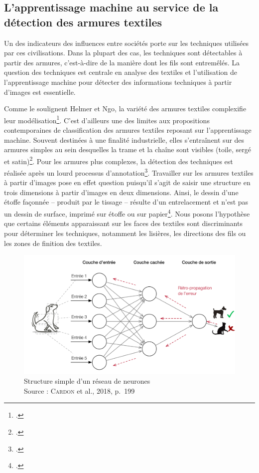 \subsection{L'apprentissage machine au service de la détection des armures textiles}

Un des indicateurs des influences entre sociétés porte sur les techniques utilisées par ces civilisations. Dans la plupart des cas, les techniques sont détectables à partir des armures, c'est-à-dire de la manière dont les fils sont entremêlés. La question des techniques est centrale en analyse des textiles et l'utilisation de l'apprentissage machine pour détecter des informations techniques à partir d'images est essentielle.


Comme le soulignent  Helmer et Ngo, la variété des armures textiles complexifie leur modélisation\footcite[p.~160]{helmerSimilarityMeasureWeaving2018}. C'est d'ailleurs une des limites aux propositions contemporaines de classification des armures textiles reposant sur l'apprentissage machine. Souvent destinées à une finalité industrielle, elles s'entraînent sur des armures simples au sein desquelles la trame et la chaîne sont visibles (toile, sergé et satin)\footcite[p.~6365-6369]{mengAutomaticRecognitionWoven2022}. Pour les armures plus complexes, la détection des techniques est réalisée après un lourd processus d'annotation\footcite[p.~169]{helmerSimilarityMeasureWeaving2018}. Travailler sur les armures textiles à partir d'images pose en effet question puisqu'il s'agit de saisir une structure en trois dimensions à partir d'images en deux dimensions. Ainsi, \og le dessin d'une étoffe façonnée -- produit par le tissage -- résulte d'un entrelacement et n'est pas un dessin de surface, imprimé sur étoffe ou sur papier\fg\footcite[p.~67]{leclercqEntretienAvecJeanPaul2016}. Nous posons l'hypothèse que certains éléments apparaissant sur les faces des textiles sont discriminants pour déterminer les techniques, notamment les lisières, les directions des fils ou les zones de finition des textiles.


\begin{figure}[!h]
    \centering
    \includegraphics[width=12cm]{../images/resSimple_CardonP199.png}
    \caption[Structure simple d'un réseau de neurones]{Structure simple d'un réseau de neurones \\ Source : C\textsc{ardon} et al., 2018, p.~199}
    \label{resSimple}
\end{figure}

